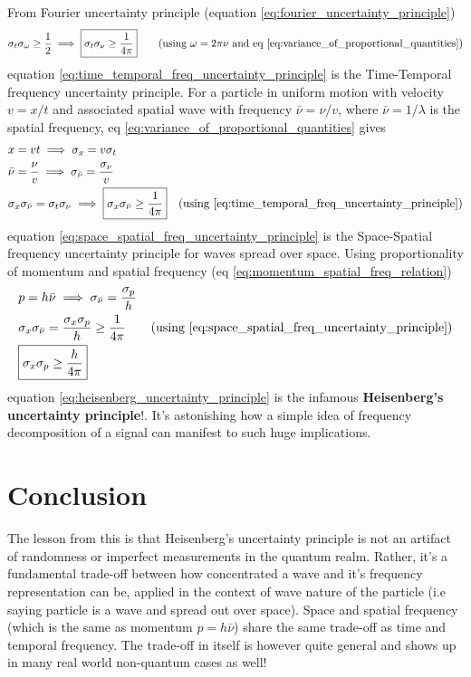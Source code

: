 \documentclass[11pt, a4paper]{article}
\let\oldsection\section
\renewcommand{\section}{%
	\setcounter{equation}{0}%
	\oldsection%
}
\newcommand{\eqrefnp}[1]{\textup{\ref{#1}}}  %
\newcommand{\stdev}[1]{\sigma_{#1}}
\begin{document}
	From Fourier uncertainty principle (equation \eqrefnp{eq:fourier_uncertainty_principle})
	\begin{equation}\label{eq:time_temporal_freq_uncertainty_principle}
		\stdev{t} \stdev{\omega} \geq \frac{1}{2} \implies \boxed{\stdev{t} \stdev{\nu} \geq \frac{1}{4\pi}} \qquad \text{(using $\omega = 2\pi \nu$ and eq \eqrefnp{eq:variance_of_proportional_quantities})}
	\end{equation}
	equation \eqref{eq:time_temporal_freq_uncertainty_principle} is the Time-Temporal frequency uncertainty principle. For a particle in uniform motion with velocity $v = x / t$ and associated spatial wave with frequency $\bar{\nu} = \nu / v$, where $\bar{\nu} = 1/\lambda$ is the spatial frequency, eq \eqref{eq:variance_of_proportional_quantities} gives
	\begin{align}
		& x = vt \implies \stdev{x} = v\stdev{t} \nonumber \\
		& \bar{\nu} = \frac{\nu}{v} \implies \stdev{\bar{\nu}} = \frac{\stdev{\nu}}{v} \nonumber \\
		& \stdev{x}\stdev{\bar{\nu}} = \stdev{t} \stdev{\nu} \implies \boxed{\stdev{x}\stdev{\bar{\nu}} \geq \frac{1}{4\pi}} \quad \text{(using \eqrefnp{eq:time_temporal_freq_uncertainty_principle})} \label{eq:space_spatial_freq_uncertainty_principle}
	\end{align}
	equation \eqref{eq:space_spatial_freq_uncertainty_principle} is the Space-Spatial frequency uncertainty principle for waves spread over space. Using proportionality of momentum and spatial frequency (eq \eqrefnp{eq:momentum_spatial_freq_relation})
	\begin{align}
		& p = h \bar{\nu} \implies \stdev{\bar{\nu}} = \frac{\stdev{p}}{h}  \nonumber \\
		& \stdev{x}\stdev{\bar{\nu}} = \frac{\stdev{x}\stdev{p}}{h} \geq \frac{1}{4 \pi} \nonumber \tag{using \eqrefnp{eq:space_spatial_freq_uncertainty_principle}} \\
		& \boxed{\stdev{x}\stdev{p} \geq \frac{h}{4 \pi}} \label{eq:heisenberg_uncertainty_principle}
	\end{align}
	equation \eqref{eq:heisenberg_uncertainty_principle} is the infamous \textbf{Heisenberg's uncertainty principle}!. It's astonishing how a simple idea of frequency decomposition of a signal can manifest to such huge implications.
	
	\section{Conclusion}
	The lesson from this is that Heisenberg's uncertainty principle is not an artifact of randomness or imperfect measurements in the quantum realm. Rather, it's a fundamental trade-off between how concentrated a wave and it's frequency representation can be, applied in the context of wave nature of the particle (i.e saying particle is a wave and spread out over space). Space and spatial frequency (which is the same as momentum $p=h\bar{\nu}$) share the same trade-off as time and temporal frequency. The trade-off in itself is however quite general and shows up in many real world non-quantum cases as well!
	
\end{document}
